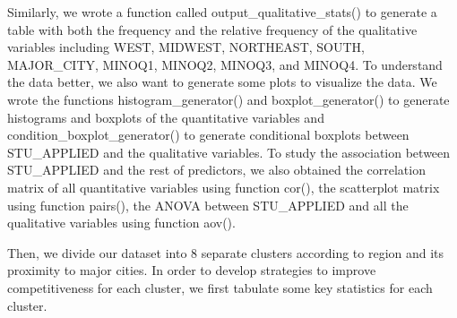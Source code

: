 \documentclass{article}
\begin{document}
Similarly, we wrote a function called output\_qualitative\_stats() to generate a table with both the frequency and the relative frequency of the qualitative variables including WEST,  MIDWEST, NORTHEAST, SOUTH, MAJOR\_CITY, MINOQ1, MINOQ2, MINOQ3, and MINOQ4. To understand the data better, we also want to generate some plots to visualize the data. We wrote the functions histogram\_generator() and boxplot\_generator() to generate histograms and boxplots of the quantitative variables and condition\_boxplot\_generator() to generate conditional boxplots between STU\_APPLIED and the qualitative variables. To study the association between STU\_APPLIED and the rest of predictors, we also obtained the correlation matrix of all quantitative variables using function cor(), the scatterplot matrix using function pairs(), the ANOVA between STU\_APPLIED and all the qualitative variables using function aov().

Then, we divide our dataset into 8 separate clusters according to region and its proximity to major cities. In order to develop strategies to improve competitiveness for each cluster, we first tabulate some key statistics for each cluster.
\end{document}
